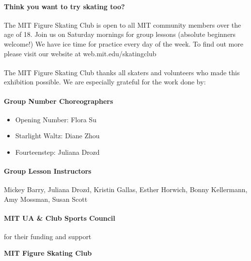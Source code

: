 \documentclass[12pt]{article}
\begin{document}
\begin{multicols*}{2}


\paragraph{Think you want to try skating too?} The MIT Figure Skating Club is open to all MIT community members over the age of 18. Join us on Saturday mornings for group lessons (absolute beginners welcome!) We have ice time for practice every day of the week. To find out more please visit our website at web.mit.edu/skatingclub

\paragraph{} The MIT Figure Skating Club thanks all skaters and volunteers who made this exhibition possible. We are especially grateful for the work done by:

\paragraph{Group Number Choreographers}
\begin{itemize}
    \item Opening Number: Flora Su
    \item Starlight Waltz: Diane Zhou
    \item Fourteenstep: Juliana Drozd
\end{itemize}

\paragraph{Group Lesson Instructors} Mickey Barry, Juliana Drozd, Kristin Gallas, Esther Horwich, Bonny Kellermann, Amy Mossman, Susan Scott
\paragraph{MIT UA \& Club Sports Council} for their funding and support

\vfill\null
\columnbreak


\begin{center}

\vspace*{1.5in}

\begin{Large}
{\bfseries
MIT Figure Skating Club
}
\end{Large}


\end{center}
\end{multicols*}
\end{document}
